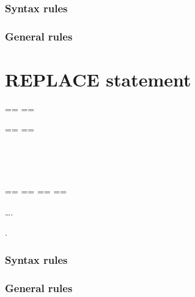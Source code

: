\subsubsection{Syntax rules}

\subsubsection{General rules}

\section{REPLACE statement}

\begin{syntax}
  \begin{0-1}
  \end{0-1}
  \begin{1=}
    \begin{1=}
      == \pseudotext == \\
      \identifier
    \end{1=}
    \begin{1=}
      == \pseudotext == \\
      \identifier
    \end{1=} \\

    \begin{1=}
       \\
    \end{1=}
    ==  ==
    ==  ==
  \end{1=}\ldots .
\end{syntax}

\begin{syntax}
  \begin{0-1}
  \end{0-1}
  .
\end{syntax}

\subsubsection{Syntax rules}

\subsubsection{General rules}

